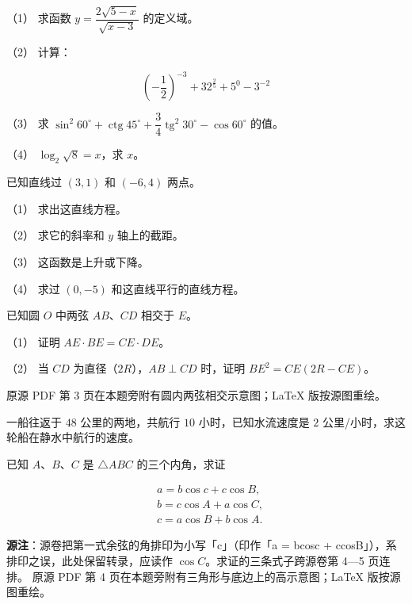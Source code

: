 \begin{question}

（1） 求函数 $y=\dfrac{2\sqrt{5-x}}{\sqrt{x-3}}$ 的定义域。

（2） 计算：

\nopagebreak[4]
\[
\left(-\frac12\right)^{-3}+32^{\frac25}+5^0-3^{-2}
\]

（3） 求 $\sin^2 60^\circ+\operatorname{ctg}45^\circ+\dfrac34\operatorname{tg}^2 30^\circ-\cos 60^\circ$ 的值。

（4） $\log_2\sqrt8=x$，求 $x$。

\end{question}
\begin{question}
已知直线过 $(3,1)$ 和 $(-6,4)$ 两点。

（1） 求出这直线方程。

（2） 求它的斜率和 $y$ 轴上的截距。

（3） 这函数是上升或下降。

（4） 求过 $(0,-5)$ 和这直线平行的直线方程。

\Needspace{0.4\textheight}
\end{question}
\begin{question}
已知圆 $O$ 中两弦 $AB$、$CD$ 相交于 $E$。

（1） 证明 $AE\cdot BE=CE\cdot DE$。

（2） 当 $CD$ 为直径（$2R$），$AB\perp CD$ 时，证明 $BE^2=CE(2R-CE)$。

\begin{gktip}
原源 PDF 第 3 页在本题旁附有圆内两弦相交示意图；LaTeX 版按源图重绘。
\end{gktip}
\nopagebreak[4]
\begin{center}\end{center}
\nopagebreak[4]
\end{question}
\begin{question}
一船往返于 $48$ 公里的两地，共航行 $10$ 小时，已知水流速度是 $2$ 公里/小时，求这轮船在静水中航行的速度。

\Needspace{0.4\textheight}
\end{question}
\begin{question}
已知 $A$、$B$、$C$ 是 $\triangle ABC$ 的三个内角，求证

\nopagebreak[4]
\[
\begin{aligned}
&a=b\cos c+c\cos B,\\
&b=c\cos A+a\cos C,\\
&c=a\cos B+b\cos A.
\end{aligned}
\]

\begin{gktip}
\textbf{源注}：源卷把第一式余弦的角排印为小写「c」（印作「a = bcosc + ccosB」），系排印之误，此处保留转录，应读作 $\cos C$。求证的三条式子跨源卷第 4—5 页连排。
原源 PDF 第 4 页在本题旁附有三角形与底边上的高示意图；LaTeX 版按源图重绘。
\end{gktip}
\nopagebreak[4]
\begin{center}\end{center}
\nopagebreak[4]
\Needspace{0.4\textheight}
\end{question}
